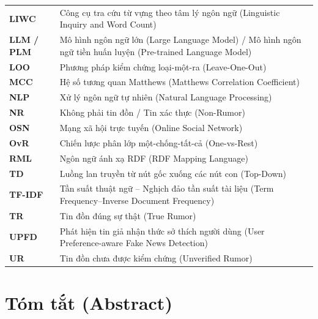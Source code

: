 \documentclass[11pt,a4paper]{extreport}
\begin{document}
\begin{tabularx}{\textwidth}{@{}lX@{}}
\textbf{LIWC} & Công cụ tra cứu từ vựng theo tâm lý ngôn ngữ (Linguistic Inquiry and Word Count) \\
\textbf{LLM / PLM} & Mô hình ngôn ngữ lớn (Large Language Model) / Mô hình ngôn ngữ tiền huấn luyện (Pre-trained Language Model) \\
\textbf{LOO} & Phương pháp kiểm chứng loại-một-ra (Leave-One-Out) \\
\textbf{MCC} & Hệ số tương quan Matthews (Matthews Correlation Coefficient) \\
\textbf{NLP} & Xử lý ngôn ngữ tự nhiên (Natural Language Processing) \\
\textbf{NR} & Không phải tin đồn / Tin xác thực (Non-Rumor) \\
\textbf{OSN} & Mạng xã hội trực tuyến (Online Social Network) \\
\textbf{OvR} & Chiến lược phân lớp một-chống-tất-cả (One-vs-Rest) \\
\textbf{RML} & Ngôn ngữ ánh xạ RDF (RDF Mapping Language) \\
\textbf{TD} & Luồng lan truyền từ nút gốc xuống các nút con (Top-Down) \\
\textbf{TF-IDF} & Tần suất thuật ngữ -- Nghịch đảo tần suất tài liệu (Term Frequency--Inverse Document Frequency) \\
\textbf{TR} & Tin đồn đúng sự thật (True Rumor) \\
\textbf{UPFD} & Phát hiện tin giả nhận thức sở thích người dùng (User Preference-aware Fake News Detection) \\
\textbf{UR} & Tin đồn chưa được kiểm chứng (Unverified Rumor) \\
\bottomrule
\end{tabularx}

\newpage
{}
\section*{Tóm tắt (Abstract)}
\end{document}
